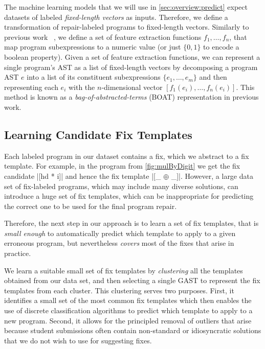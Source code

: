  The machine learning models that we will use in
\autoref{sec:overview:predict} expect datasets of labeled \emph{fixed-length
vectors} as inputs. Therefore, we define a transformation of repair-labeled
programs to fixed-length vectors. Similarly to previous work
~\citep{Seidel:2017}, we define a set of feature extraction functions $f_1,
\ldots, f_n$, that map program subexpressions to a numeric value (or just $\{0,
1\}$ to encode a boolean property). Given a set of feature extraction functions,
we can represent a single program's AST as a list of fixed-length vectors by
decomposing a program AST $e$ into a list of its constituent subexpressions
$\{e_1, \ldots, e_m\}$ and then representing each $e_i$ with the $n$-dimensional
vector $[f_1(e_i), \ldots, f_n(e_i)]$. This method is known as a
\emph{bag-of-abstracted-terms} (BOAT) representation in previous work.


\subsection{Learning Candidate Fix Templates}
\label{sec:overview:learn}

Each labeled program in our dataset contains a fix, which we abstract to a fix
template. For example, in the \mbd program from \autoref{fig:mulByDigit} we get
the fix candidate |[hd * i]| and hence the fix template |[_ $\oplus$ _]|.
However, a large data set of fix-labeled programs, which may include many
diverse solutions, can introduce a huge set of fix templates, which can be
inappropriate for predicting the correct one to be used for the final program
repair.

Therefore, the next step in our approach is to learn a set of fix templates,
that is \emph{small enough} to automatically predict which template to apply to
a given erroneous program, but nevertheless \emph{covers} most of the fixes that
arise in practice.

 We learn a suitable small set of fix templates by
\emph{clustering} all the templates obtained from our data set, and then
selecting a single GAST to represent the fix templates from each cluster.
%
This clustering serves two purposes.
%
First, it identifies a small set of the most common fix templates which then
enables the use of discrete classification algorithms to predict which template
to apply to a new program.
%
Second, it allows for the principled removal of outliers that arise because
student submissions often contain non-standard or idiosyncratic solutions that
we do not wish to use for suggesting fixes.


